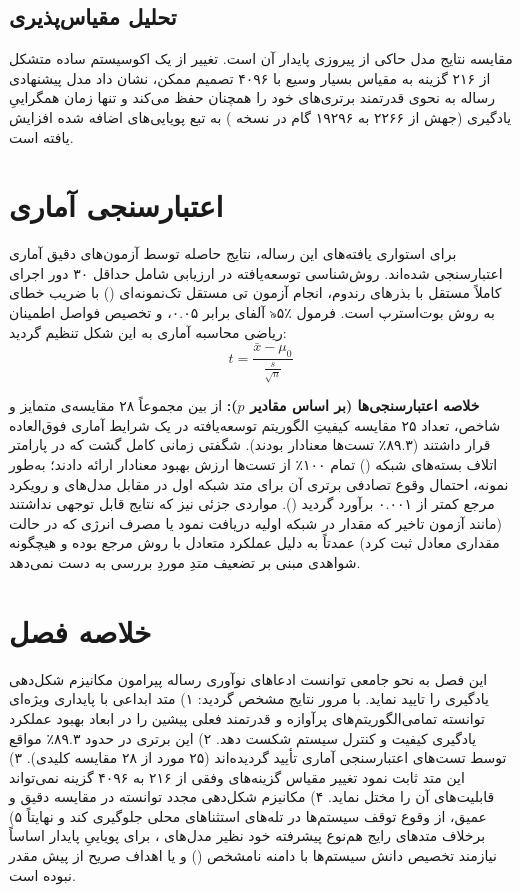 \documentclass[oneside,openany,phd]{TMU-Thesis}
\begin{document}
\subsection{تحلیل مقیاس‌پذیری}

مقایسه نتایج مدل حاکی از پیروزی پایدار آن است. تغییر از یک اکوسیستم ساده متشکل از ۲۱۶ گزینه به مقیاس بسیار وسیع با ۴۰۹۶ تصمیم ممکن، نشان داد مدل پیشنهادی رساله به نحوی قدرتمند برتری‌های خود را همچنان حفظ می‌کند و تنها زمان همگراییِ یادگیری (جهش از ۲۲۶۶ به ۱۹۲۹۶ گام در نسخه ) به تبع پویایی‌های اضافه شده افزایش یافته است.

\section{اعتبارسنجی آماری}

برای استواری یافته‌های این رساله، نتایج حاصله توسط آزمون‌های دقیق آماری اعتبارسنجی شده‌اند. 
روش‌شناسی توسعه‌یافته در ارزیابی شامل حداقل ۳۰ دور اجرای کاملاً مستقل با بذرهای رندوم، انجام آزمون تی مستقل تک‌نمونه‌ای () با ضریب خطای آلفای برابر ۰.۰۵، و تخصیص فواصل اطمینان ৯۵٪ به روش بوت‌استرپ است.
فرمول ریاضی محاسبه آماری به این شکل تنظیم گردید:
$$t = \frac{\bar{x} - \mu_0}{\frac{s}{\sqrt{n}}}$$

\textbf{خلاصه اعتبارسنجی‌ها (بر اساس مقادیر $p$):}
از بین مجموعاً ۲۸ مقایسه‌ی متمایز و شاخص، تعداد ۲۵ مقایسه کیفیتِ الگوریتم توسعه‌یافته در یک شرایط آماری فوق‌العاده قرار داشتند (۸۹.۳٪ تست‌ها معنادار بودند). شگفتی زمانی کامل گشت که در پارامتر اتلاف بسته‌های شبکه () تمام ۱۰۰٪ از تست‌ها ارزش بهبود معنادار ارائه دادند؛ به‌طور نمونه، احتمال وقوع تصادفی برتری آن برای متد  شبکه اول در مقابل مدل‌های  و رویکرد مرجع کمتر از ۰.۰۰۱ برآورد گردید (). مواردی جزئی نیز که نتایج قابل توجهی نداشتند (مانند آزمون تاخیر که مقدار  در شبکه اولیه دریافت نمود یا مصرف انرژی که در حالت  مقداری معادل  ثبت کرد) عمدتاً به دلیل عملکرد متعادل با روش مرجع بوده و هیچگونه شواهدی مبنی بر تضعیف متدِ موردِ بررسی به دست نمی‌دهد.

\section{خلاصه فصل}

این فصل به نحو جامعی توانست ادعاهای نوآوری رساله پیرامون مکانیزم شکل‌دهی یادگیری را تایید نماید. با مرور نتایج مشخص گردید: ۱) متد ابداعی  با پایداری ویژه‌ای توانسته تمامی‌الگوریتم‌های پرآوازه و قدرتمند فعلی پیشین را در ابعاد بهبود عملکرد یادگیری کیفیت و کنترل سیستم شکست دهد. ۲) این برتری در حدود ۸۹.۳٪ مواقع توسط تست‌های اعتبارسنجی آماری تأیید گردیده‌اند (۲۵ مورد از ۲۸ مقایسه کلیدی). ۳) این متد ثابت نمود تغییر مقیاس گزینه‌های وفقی از ۲۱۶ به ۴۰۹۶ گزینه نمی‌تواند قابلیت‌های آن را مختل نماید. ۴) مکانیزم شکل‌دهی مجدد توانسته در مقایسه دقیق و عمیق، از وقوع توقف سیستم‌ها در تله‌های استثناهای محلی جلوگیری کند و نهایتاً ۵) برخلاف متدهای رایج هم‌نوع پیشرفته خود نظیر مدل‌های ، برای پویاییِ پایدار اساساً نیازمند تخصیص دانش سیستم‌ها با دامنه نامشخص () و یا اهداف صریح از پیش مقدر نبوده است.
\end{document}
